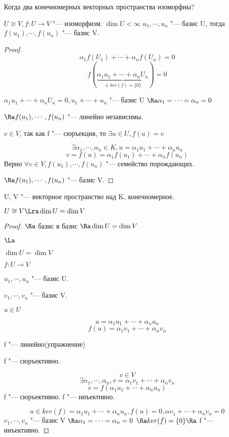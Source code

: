 Когда два конечномерных векторных пространства изоморфны?
\begin{lemma}
$U \cong V, f \colon U \to V$ "--- изоморфизм.
$\dim U < \infty$
$u_1, \cdots, u_n$ "--- базис U, 
тогда $f(u_1), \cdots, f(u_n)$ "--- базис V.
\end{lemma}
\begin{proof}
$$\alpha_1 f(U_1) + \cdots + \alpha_nf(U_n) = 0$$
$$f(\underbrace{\alpha_1 u_1 + \cdots + \alpha_nU_n}_{\in ker(f) = \{0\}}) = 0$$

$\alpha_1u_1 + \cdots + \alpha_nU_n = 0, u_1 + \cdots + u_n$ "--- базис U $\Ra \alpha_1 = \cdots = \alpha_n = 0$

$\Ra f(u_1), \cdots, f(u_n)$ "--- линейно независимы.

$v \in V$, так как f "--- сюръекция, то $\exists u \in U, f(u) = v$

$$\exists \alpha_1, \cdots, \alpha_n \in  K, u = \alpha_1 u_1 + \cdots + \alpha_nu_n$$ 
$$v = f(u) = \alpha_1f(u_1) + \cdots + \alpha_nf(u_n)$$
Верно $\forall v \in V, f(u_1), \cdots, f(u_n)$ "--- семейство порождающих.

$\Ra f(u_1), \cdots, f(u_n)$ "--- базис V.
\end{proof}

\begin{conseq}
U, V "--- векторное пространство над K, конечномерное. 

$U \cong V \Lra \dim U = \dim V$
\end{conseq}

\begin{proof}
$\Ra$ базис в базис $\Ra \dim U = \dim V$

$\La$

$\dim U = \dim V$

$f: U \to V$ 

$u_1, \cdots, u_n$ "--- базис U.

$v_1, \cdots, v_n$ "--- базис V.

$u \in U$

$$u = \alpha_1u_1 + \cdots + \alpha_nu_n$$
$$f(u) = \alpha_1 v_1 + \cdots + \alpha_n v_n$$

f "--- линейно(упражнение)

f "--- сюръективно.

$$v \in V$$
$$\exists \alpha_1, \cdots, \alpha_n, v = \alpha_1 v_1 + \cdots + \alpha_n v_n$$
$$v = f(\alpha_1 u_1 + \cdots + \alpha_n u_n)$$
f "--- сюръективно.
f "--- инъективно.

$$u \in ker(f) = \alpha_1 u_1 + \cdots + \alpha_nu_n, f(u) = 0, 
\alpha v_1 + \cdots + \alpha_nv_n = 0 $$
$v_1, \cdots, v_n$ "--- базис V $\Ra \alpha_1 = \cdots = \alpha_n = 0$
$\Ra ker(f) = \{0\} \Ra$ f "--- инъективно.

\end{proof}

